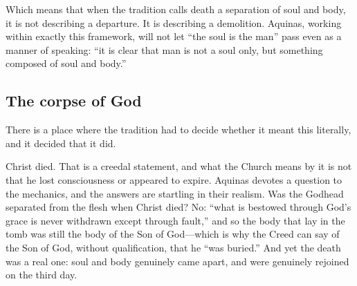 Which means that when the tradition calls death a separation of soul and body, it is not describing a departure. It is describing a demolition. Aquinas, working within exactly this framework, will not let ``the soul is the man'' pass even as a manner of speaking: ``it is clear that man is not a soul only, but something composed of soul and body.''

\subsection{The corpse of God}

There is a place where the tradition had to decide whether it meant this literally, and it decided that it did.

Christ died. That is a creedal statement, and what the Church means by it is not that he lost consciousness or appeared to expire. Aquinas devotes a question to the mechanics, and the answers are startling in their realism. Was the Godhead separated from the flesh when Christ died? No: ``what is bestowed through God's grace is never withdrawn except through fault,'' and so the body that lay in the tomb was still the body of the Son of God---which is why the Creed can say of the Son of God, without qualification, that he ``was buried.'' And yet the death was a real one: soul and body genuinely came apart, and were genuinely rejoined on the third day.

